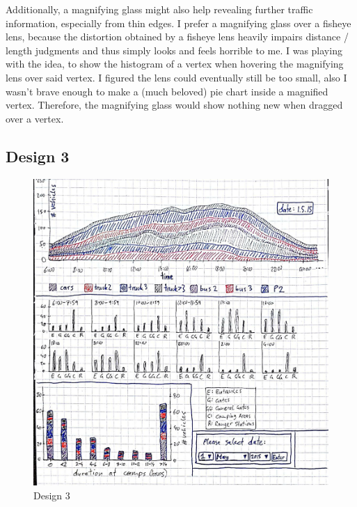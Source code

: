 \documentclass{article}
\begin{document}
Additionally, a magnifying glass might also help revealing further traffic information, especially from thin edges. I prefer a magnifying glass over a fisheye lens, because the distortion obtained by a fisheye lens heavily impairs distance / length judgments and thus simply looks and feels horrible to me. I was playing with the idea, to show the histogram of a vertex when hovering the magnifying lens over said vertex. I figured the lens could eventually still be too small, also I wasn't brave enough to make a (much beloved) pie chart inside a magnified vertex. Therefore, the magnifying glass would show nothing new when dragged over a vertex.


\subsection*{Design 3}

\begin{figure}[h]
	\centering
	\includegraphics[scale=0.45]{Design3.jpg}	
	\caption{Design 3}
	\label{fig:design3}
\end{figure}
\end{document}
